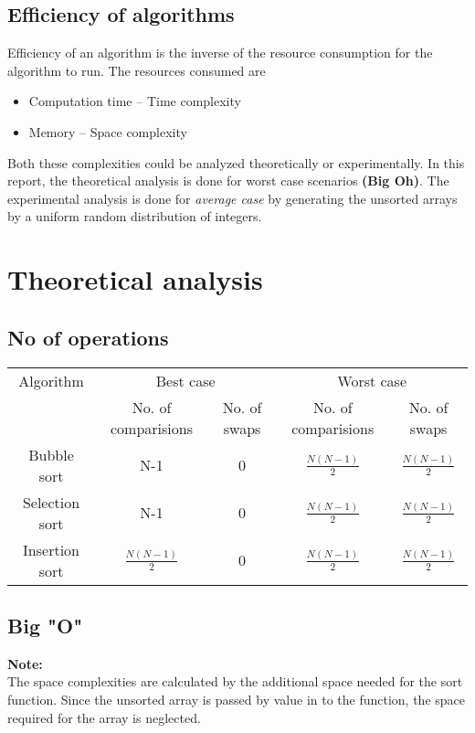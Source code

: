 \documentclass[11pt]{article}
\begin{document}
\subsection{Efficiency of algorithms}
Efficiency of an algorithm is the inverse of the resource consumption for the algorithm to run. The resources consumed are
\begin{itemize}
\item Computation time -- Time complexity
\item Memory -- Space complexity
\end{itemize}

Both these complexities could be analyzed theoretically or experimentally. In this report, the theoretical analysis is done for worst case scenarios \textbf{(Big Oh)}. The experimental analysis is done for \emph{average case} by generating the unsorted arrays by a uniform random distribution of integers.


\section{Theoretical analysis}

\subsection{No of operations}
\begin{tabular}{|c |c| c |c| c|}

\hline
Algorithm		&\multicolumn{2}{c}{Best case}		&\multicolumn{2}{c}{Worst case}\\
&No. of comparisions&No. of swaps&No. of comparisions&No. of swaps\\
\hline				
Bubble sort	&N-1	&0	&$\frac{N(N-1)}{2}$		&$\frac{N(N-1)}{2}$\\
\hline
Selection sort	&N-1	&0	&$\frac{N(N-1)}{2}$		&$\frac{N(N-1)}{2}$\\
\hline
Insertion sort	&$\frac{N(N-1)}{2}$	&0	&$\frac{N(N-1)}{2}$		&$\frac{N(N-1)}{2}$\\
\hline
\end{tabular}


\subsection{Big "O"}
\textbf{Note:}\\The space complexities are calculated by the additional space needed for the sort function. Since the unsorted array is passed by value in to the function, the space required for the array is neglected.\\
\end{document}
